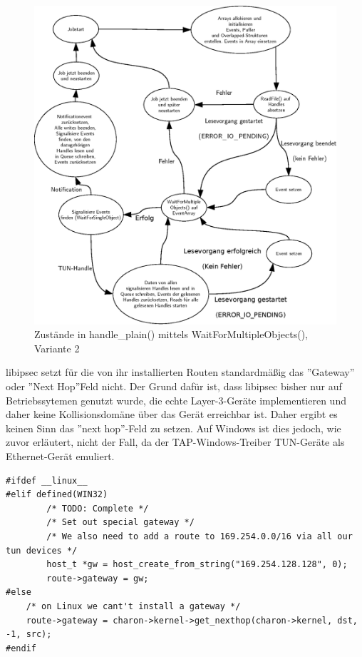 \begin{figure}
\centering
\def\svgwidth{\columnwidth}
\includegraphics[width=\textwidth]{WaitForMultipleObjects2.eps}
\caption{Zustände in handle\_plain() mittels WaitForMultipleObjects(), Variante 2}
\label{fig:WaitForMultipleObjects2}
\end{figure}

libipsec setzt für die von ihr installierten Routen standardmäßig das ''Gateway''
oder ''Next Hop''Feld nicht. Der Grund dafür ist, dass libipsec bisher nur auf
Betriebssytemen genutzt wurde, die echte Layer-3-Geräte implementieren und
daher keine Kollisionsdomäne über das Gerät erreichbar ist. Daher ergibt es keinen
Sinn das ''next hop''-Feld zu setzen.
Auf Windows ist dies jedoch, wie zuvor erläutert, nicht der Fall, da der TAP-Windows-Treiber
TUN-Geräte als Ethernet-Gerät emuliert.
\begin{lstlisting}[caption=Patch für die Routen-Installation von libipsec]
#ifdef __linux__
#elif defined(WIN32)
        /* TODO: Complete */
        /* Set out special gateway */
        /* We also need to add a route to 169.254.0.0/16 via all our tun devices */
        host_t *gw = host_create_from_string("169.254.128.128", 0);
        route->gateway = gw;
#else
	/* on Linux we cant't install a gateway */
	route->gateway = charon->kernel->get_nexthop(charon->kernel, dst, -1, src);
#endif
\end{lstlisting}

